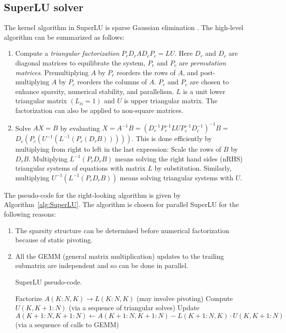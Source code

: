 \documentclass[12pt]{article}
\begin{document}
	  

\subsection{SuperLU solver}
The kernel algorithm in SuperLU is sparse Gaussian elimination \citep{li05}. The high-level algorithm can be summarized as follows:
\begin{enumerate}
	\item Compute a \emph{triangular factorization} $P_rD_rAD_cP_c=LU$. Here $D_r$ and $D_c$ are diagonal matrices to equilibrate the system, $P_r$ and $P_c$ are \emph{permutation matrices}. Premultiplying $A$ by $P_r$ reorders the rows of $A$, and post-multiplying $A$ by $P_c$ reorders the columns of $A$. $P_r$ and $P_c$ are chosen to enhance sparsity, numerical stability, and parallelism. $L$ is a unit lower triangular matrix $(L_{ii}=1)$ and $U$ is upper triangular matrix. The factorization can also be applied to non-square matrices.
	\item Solve $AX=B$ by evaluating $X=A^{-1}B=(D_r^{-1}P_r^{-1}LU P_c^{-1}D_c^{-1})^{-1}B =$ \\ $D_c(P_c(U^{-1}(L^{-1}(P_r(D_rB)))))$. This is done efficiently by multiplying from right to left in the last expression: Scale the rows of $B$ by $D_r B$. Multiplying $L^{-1}(P_rD_rB)$ means solving the right hand sides (nRHS) triangular systems of equations with matrix $L$ by substitution. Similarly, multiplying $U^{-1}(L^{-1}(P_rD_rB))$ means solving triangular systems with $U$.
\end{enumerate}

The pseudo-code for the right-looking algorithm is given by Algorithm~\ref{alg:SuperLU}. The algorithm is chosen for parallel SuperLU for the following reasons:
  \begin{enumerate}
	  \item The sparsity structure can be determined before numerical factorization because of static pivoting.
	  \item All the GEMM (general matrix multiplication) updates to the trailing submatrix are independent and so can be done in parallel.
\begin{algorithm}
  \caption{SuperLU pseudo-code.}
  \label{alg:SuperLU}
  \begin{algorithmic}[1]
      \State Factorize $A(K:N,K) \rightarrow L(K:N,K)$
	  (may involve pivoting)
	  \State Compute $U(K,K+1:N)$
	  (via a sequence of triangular solves)
	  \State Update $A(K+1:N,K+1:N) \leftarrow A(K+1:N,K+1:N)-L(K+1:N,K) \cdot U(K,K+1:N)$
	  (via a sequence of calls to GEMM)
	  \EndFor
  \end{algorithmic}
\end{algorithm}
	  
   \end{enumerate}
\end{document}

